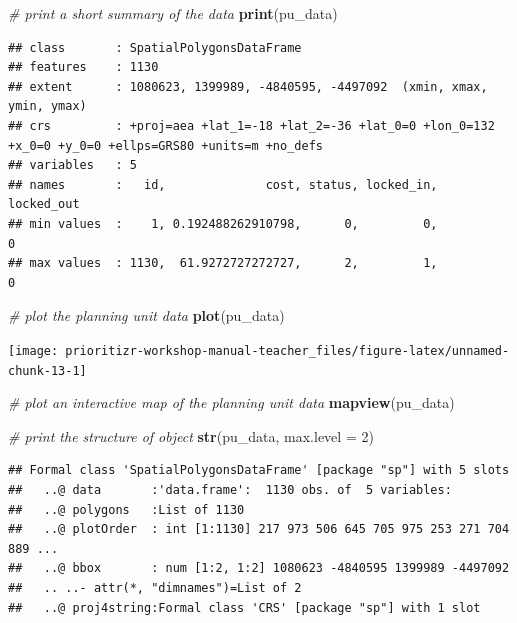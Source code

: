 \documentclass[12pt,]{book}
\newenvironment{Shaded}{\begin{snugshade}}{\end{snugshade}}
\newcommand{\KeywordTok}[1]{\textcolor[rgb]{0.13,0.29,0.53}{\textbf{#1}}}
\newcommand{\DataTypeTok}[1]{\textcolor[rgb]{0.13,0.29,0.53}{#1}}
\newcommand{\DecValTok}[1]{\textcolor[rgb]{0.00,0.00,0.81}{#1}}
\newcommand{\CommentTok}[1]{\textcolor[rgb]{0.56,0.35,0.01}{\textit{#1}}}
\newcommand{\NormalTok}[1]{#1}
\begin{document}
\begin{Shaded}
\begin{Highlighting}[]
\CommentTok{# print a short summary of the data}
\KeywordTok{print}\NormalTok{(pu_data)}
\end{Highlighting}
\end{Shaded}

\begin{verbatim}
## class       : SpatialPolygonsDataFrame 
## features    : 1130 
## extent      : 1080623, 1399989, -4840595, -4497092  (xmin, xmax, ymin, ymax)
## crs         : +proj=aea +lat_1=-18 +lat_2=-36 +lat_0=0 +lon_0=132 +x_0=0 +y_0=0 +ellps=GRS80 +units=m +no_defs 
## variables   : 5
## names       :   id,              cost, status, locked_in, locked_out 
## min values  :    1, 0.192488262910798,      0,         0,          0 
## max values  : 1130,  61.9272727272727,      2,         1,          0
\end{verbatim}

\begin{Shaded}
\begin{Highlighting}[]
\CommentTok{# plot the planning unit data}
\KeywordTok{plot}\NormalTok{(pu_data)}
\end{Highlighting}
\end{Shaded}

\begin{center}\texttt{[image: prioritizr-workshop-manual-teacher\_files/figure-latex/unnamed-chunk-13-1]} \end{center}

\begin{Shaded}
\begin{Highlighting}[]
\CommentTok{# plot an interactive map of the planning unit data}
\KeywordTok{mapview}\NormalTok{(pu_data)}
\end{Highlighting}
\end{Shaded}

\begin{Shaded}
\begin{Highlighting}[]
\CommentTok{# print the structure of object}
\KeywordTok{str}\NormalTok{(pu_data, }\DataTypeTok{max.level =} \DecValTok{2}\NormalTok{)}
\end{Highlighting}
\end{Shaded}

\begin{verbatim}
## Formal class 'SpatialPolygonsDataFrame' [package "sp"] with 5 slots
##   ..@ data       :'data.frame':  1130 obs. of  5 variables:
##   ..@ polygons   :List of 1130
##   ..@ plotOrder  : int [1:1130] 217 973 506 645 705 975 253 271 704 889 ...
##   ..@ bbox       : num [1:2, 1:2] 1080623 -4840595 1399989 -4497092
##   .. ..- attr(*, "dimnames")=List of 2
##   ..@ proj4string:Formal class 'CRS' [package "sp"] with 1 slot
\end{verbatim}
\end{document}
